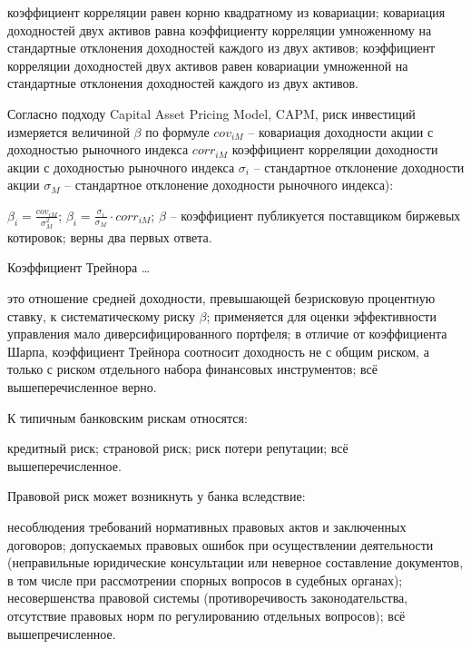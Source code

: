 \documentclass[12pt, table]{exam}
\begin{document}
\begin{questions}
\begin{multicols}{2}
\begin{choices}
	 \CC коэффициент корреляции равен корню квадратному из ковариации;
	 \choice ковариация доходностей двух активов равна коэффициенту корреляции умноженному на стандартные отклонения доходностей каждого из двух активов;
	 \choice коэффициент корреляции доходностей двух активов равен ковариации умноженной на стандартные отклонения доходностей каждого из двух активов.
	 \end{choices}
\question Согласно подходу Capital Asset Pricing Model, CAPM, риск инвестиций измеряется величиной $\beta$ по формуле $cov_{iM}$ – ковариация доходности акции с доходностью рыночного индекса $corr_{iM}$  коэффициент корреляции доходности акции с доходностью рыночного индекса $\sigma_i$ – стандартное отклонение доходности акции $\sigma_M$ – стандартное отклонение доходности рыночного индекса):
	 \begin{choices}
	 \CC $\beta_i=\frac{cov_{iM}}{\sigma_M^2}$;
	 \choice $\beta_i=\frac{\sigma_i}{\sigma_M} \cdot corr_{iM}$;
	 \choice $\beta$ – коэффициент публикуется поставщиком биржевых котировок;
	 \choice верны два первых ответа.
	 \end{choices}
\question Коэффициент Трейнора …
	 \begin{choices}
	 \choice это отношение средней доходности, превышающей безрисковую процентную ставку, к систематическому риску $\beta$;
	 \choice применяется для оценки эффективности управления мало диверсифицированного портфеля;
	 \choice в отличие от коэффициента Шарпа, коэффициент Трейнора соотносит доходность не с общим риском, а только с риском отдельного набора финансовых инструментов;
	 \CC всё вышеперечисленное верно.
	 \end{choices}
\question К типичным банковским рискам относятся:
	 \begin{choices}
	 \choice кредитный риск;
	 \CC страновой риск;
	 \choice риск потери репутации;
	 \choice всё вышеперечисленное.
	 \end{choices}
\question Правовой риск может возникнуть у банка вследствие:
	 \begin{choices}
	 \choice несоблюдения требований нормативных правовых актов и заключенных договоров;
	 \choice допускаемых правовых ошибок при осуществлении деятельности (неправильные юридические консультации или неверное составление документов, в том числе при рассмотрении спорных вопросов в судебных органах);
	 \CC несовершенства правовой системы (противоречивость законодательства, отсутствие правовых норм по регулированию отдельных вопросов);
	 \choice всё вышепречисленное.
	 \end{choices}

\end{multicols}
\end{questions}
\end{document}

